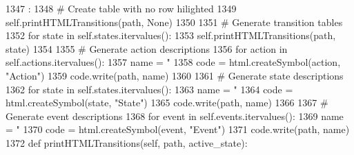 \begin{DoxyCode}
1347                                   :
1348         # Create table with no row hilighted
1349         self.printHTMLTransitions(path, None)
1350 
1351         # Generate transition tables
1352         for state in self.states.itervalues():
1353             self.printHTMLTransitions(path, state)
1354 
1355         # Generate action descriptions
1356         for action in self.actions.itervalues():
1357             name = "%
1358             code = html.createSymbol(action, "Action")
1359             code.write(path, name)
1360 
1361         # Generate state descriptions
1362         for state in self.states.itervalues():
1363             name = "%
1364             code = html.createSymbol(state, "State")
1365             code.write(path, name)
1366 
1367         # Generate event descriptions
1368         for event in self.events.itervalues():
1369             name = "%
1370             code = html.createSymbol(event, "Event")
1371             code.write(path, name)
1372 
    def printHTMLTransitions(self, path, active_state):
\end{DoxyCode}



